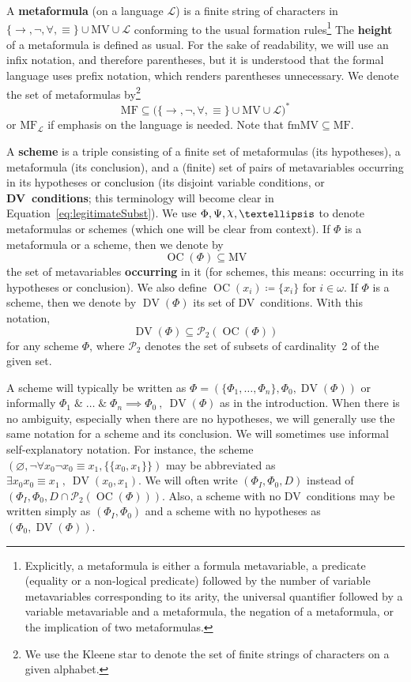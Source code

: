 \documentclass[11pt]{article}
\DeclareRobustCommand{\Chi}{{\mathpalette\irchi\relax}}
\newcommand*{\irchi}[2]{\raisebox{\depth}{$#1\chi$}}%
\newcommand*{\andd}{\;\&\;}
\newcommand*{\rimplies}{\implies}
\newcommand*{\comma}{\:,\:}
\newcommand*{\define}[1]{\textbf{#1}}%
\newcommand*{\calL}{\mathcal{L}}
\newcommand*{\calP}{\mathcal{P}}
\newcommand*{\fmMV}{\mathrm{fmMV}}
\newcommand*{\MV}{\mathrm{MV}}
\newcommand*{\MF}{\mathrm{MF}}
\DeclareMathOperator{\DV}{DV}
\DeclareMathOperator{\OC}{OC}
\theoremstyle{plain}
\theoremstyle{definition}
\theoremstyle{remark}
\begin{document}
A \define{metaformula} (on a language $\calL$) is a finite string of characters in
$\{ \to , \neg, \forall, \equiv \} \cup \MV \cup \calL$ conforming to the usual formation
rules\footnote{
Explicitly, a metaformula is either a formula metavariable, a predicate (equality or a
non-logical predicate) followed by the number of variable metavariables corresponding to its
arity, the universal quantifier followed by a variable metavariable and a metaformula, the
negation of a metaformula, or the implication of two metaformulas.}
The \define{height} of a metaformula is defined as usual.
For the sake of readability, we will use an infix notation, and therefore parentheses, but it is
understood that the formal language uses prefix notation, which renders parentheses unnecessary.
We denote the set of metaformulas by\footnote{We use the Kleene star to denote the set of finite
strings of characters on a given alphabet.}
\begin{equation}
\MF \subseteq \bigl( \{ \to , \neg, \forall, \equiv \} \cup \MV \cup \calL \bigr)^*
\end{equation}
or $\MF_\calL$ if emphasis on the language is needed.
Note that $\fmMV \subseteq \MF$.

A \define{scheme} is a triple consisting of a finite set of metaformulas (its hypotheses), a
metaformula (its conclusion), and a (finite) set of pairs of metavariables occurring in its
hypotheses or conclusion (its disjoint variable conditions, or \define{DV~conditions}; this
terminology will become clear in Equation~\eqref{eq:legitimateSubst}).
We use $\Phi, \Psi, \Chi, \dots$ to denote metaformulas or schemes (which one will be clear
from context).
If $\Phi$ is a metaformula or a scheme, then we denote by
\begin{equation}
\OC(\Phi) \subseteq \MV
\end{equation}
the set of metavariables \define{occurring} in it (for schemes, this means: occurring in its
hypotheses or conclusion).
We also define $\OC(x_i) \coloneqq \{x_i\}$ for $i \in \omega$.
If $\Phi$ is a scheme, then we denote by $\DV(\Phi)$ its set of DV~conditions.
With this notation, 
\begin{equation}
\DV(\Phi) \subseteq \calP_2(\OC(\Phi))
\end{equation}
for any scheme $\Phi$, where $\calP_2$ denotes the set of subsets of cardinality~2 of the given set.

A scheme will typically be written as $\Phi = (\{\Phi_1, \dots, \Phi_n\}, \Phi_0, \DV(\Phi))$ or
informally $\Phi_1 \andd \dots \andd \Phi_n \rimplies \Phi_0 \comma \DV(\Phi)$ as in the introduction.
When there is no ambiguity, especially when there are no hypotheses, we will generally use the
same notation for a scheme and its conclusion.
We will sometimes use informal self-explanatory notation.
For instance, the scheme $(\varnothing, \neg\forall x_0 \neg x_0 \equiv x_1, \{\{x_0, x_1\}\})$
may be abbreviated as $\exists x_0 x_0 \equiv x_1 \comma \DV(x_0, x_1)$.
We will often write $(\Phi_I, \Phi_0, D)$ instead of $(\Phi_I, \Phi_0, D \cap \calP_2(\OC(\Phi)))$.
Also, a scheme with no DV~conditions may be written simply as $(\Phi_I, \Phi_0)$
and a scheme with no hypotheses as $(\Phi_0, \DV(\Phi))$.
\end{document}

